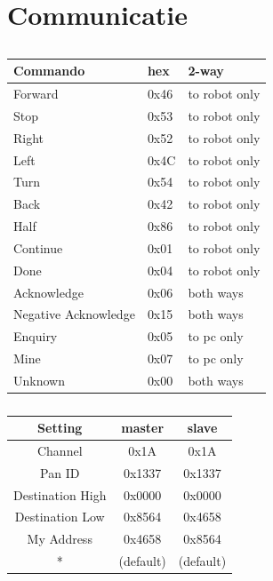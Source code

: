\documentclass{report}
\begin{document}
\section{Communicatie}
\label{sec:communicatie}
\begin{table}[H]
\centering
\caption{}
\begin{subtable}{0.48\textwidth}
\label{tab:comProtocol}
\centering
\begin{tabular}{@{}lll@{}}
\toprule
\textbf{Commando} & \textbf{hex} & \textbf{2-way} \\
\midrule
Forward				& 0x46 	& to robot only\\
Stop 					& 0x53 	& to robot only\\
Right 					& 0x52 	& to robot only\\
Left 					& 0x4C 	& to robot only\\
Turn					& 0x54 	& to robot only\\
Back					& 0x42 	& to robot only\\
Half					& 0x86 	& to robot only\\
Continue				& 0x01	& to robot only\\
Done 					& 0x04	& to robot only\\
Acknowledge 			& 0x06	& both ways\\
Negative Acknowledge 		& 0x15	& both ways \\
Enquiry 				& 0x05	& to pc only\\
Mine 					& 0x07	& to pc only\\
Unknown 				& 0x00	& both ways\\
\bottomrule
\end{tabular}
\end{subtable}
\quad
\begin{subtable}{0.48\textwidth}
\label{tab:XBeeSettings}
\centering
\begin{tabular}{@{}ccc@{}}
\toprule
\textbf{Setting} & \textbf{master}& \textbf{slave} \\
\midrule
Channel				& 0x1A 	& 0x1A\\
Pan ID				& 0x1337 	& 0x1337\\
Destination High			& 0x0000	& 0x0000\\
Destination Low			& 0x8564 	& 0x4658\\
My Address				& 0x4658 	& 0x8564\\
*		 			& (default)	&(default)\\
\bottomrule
\end{tabular}
\end{subtable}
\end{table}
\end{document}
